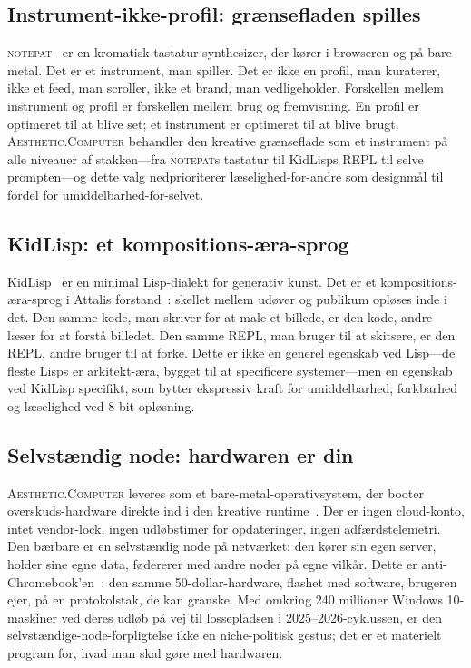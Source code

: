 \documentclass[10pt,letterpaper,twocolumn]{article}
\newcommand{\ac}{\textsc{Aesthetic.Computer}}
\newcommand{\np}{\textsc{notepat}}
\begin{document}
\subsection{Instrument-ikke-profil: gr{\ae}nsefladen spilles}

\np{}~\citep{scudder2026notepat} er en kromatisk tastatur-synthesizer, der kører i browseren og på bare metal. Det er et instrument, man spiller. Det er ikke en profil, man kuraterer, ikke et feed, man scroller, ikke et brand, man vedligeholder. Forskellen mellem instrument og profil er forskellen mellem brug og fremvisning. En profil er optimeret til at blive set; et instrument er optimeret til at blive brugt. \ac{} behandler den kreative grænseflade som et instrument på alle niveauer af stakken---fra \np{}s tastatur til KidLisps REPL til selve prompten---og dette valg nedprioriterer læselighed-for-andre som designmål til fordel for umiddelbarhed-for-selvet.

\subsection{KidLisp: et kompositions-{\ae}ra-sprog}

KidLisp~\citep{scudder2026kidlisp} er en minimal Lisp-dialekt for generativ kunst. Det er et kompositions-æra-sprog i Attalis forstand~\citep{attali1985noise}: skellet mellem udøver og publikum opløses inde i det. Den samme kode, man skriver for at male et billede, er den kode, andre læser for at forstå billedet. Den samme REPL, man bruger til at skitsere, er den REPL, andre bruger til at forke. Dette er ikke en generel egenskab ved Lisp---de fleste Lisps er arkitekt-æra, bygget til at specificere systemer---men en egenskab ved KidLisp specifikt, som bytter ekspressiv kraft for umiddelbarhed, forkbarhed og læselighed ved 8-bit opløsning.

\subsection{Selvst{\ae}ndig node: hardwaren er din}

\ac{} leveres som et bare-metal-operativsystem, der booter overskuds-hardware direkte ind i den kreative runtime~\citep{scudder2026os, scudder2026identity}. Der er ingen cloud-konto, intet vendor-lock, ingen udløbstimer for opdateringer, ingen adfærdstelemetri. Den bærbare er en selvstændig node på netværket: den kører sin egen server, holder sine egne data, fødererer med andre noder på egne vilkår. Dette er anti-Chromebook'en~\citep{scudder2026openschools}: den samme 50-dollar-hardware, flashet med software, brugeren ejer, på en protokolstak, de kan granske. Med omkring 240 millioner Windows 10-maskiner ved deres udløb på vej til lossepladsen i 2025--2026-cyklussen, er den selvstændige-node-forpligtelse ikke en niche-politisk gestus; det er et materielt program for, hvad man skal gøre med hardwaren.
\end{document}
